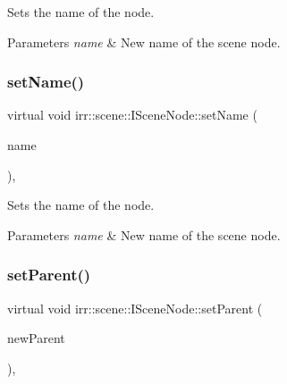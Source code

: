 Sets the name of the node. 


\begin{DoxyParams}{Parameters}
{\em name} & New name of the scene node. \\
\hline
\end{DoxyParams}
\mbox{\label{classirr_1_1scene_1_1ISceneNode_a20a22d956974f4817a20663361f20042}} 
\subsubsection{\texorpdfstring{set\+Name()}{setName()}\hspace{0.1cm}{\footnotesize\ttfamily [4/4]}}
{\footnotesize\ttfamily virtual void irr\+::scene\+::\+I\+Scene\+Node\+::set\+Name (\begin{DoxyParamCaption}\item[{const \hyperlink{namespaceirr_1_1core_ab26a0e0359206b5a694f35c37c829d7f}{core\+::stringc} \&}]{name }\end{DoxyParamCaption})\hspace{0.3cm}{\ttfamily [inline]}, {\ttfamily [virtual]}}



Sets the name of the node. 


\begin{DoxyParams}{Parameters}
{\em name} & New name of the scene node. \\
\hline
\end{DoxyParams}
\mbox{\label{classirr_1_1scene_1_1ISceneNode_a59e7f36cb5c9c4895e06fce0ca5eb276}} 
\subsubsection{\texorpdfstring{set\+Parent()}{setParent()}\hspace{0.1cm}{\footnotesize\ttfamily [1/2]}}
{\footnotesize\ttfamily virtual void irr\+::scene\+::\+I\+Scene\+Node\+::set\+Parent (\begin{DoxyParamCaption}\item[{\hyperlink{classirr_1_1scene_1_1ISceneNode}{I\+Scene\+Node} $\ast$}]{new\+Parent }\end{DoxyParamCaption})\hspace{0.3cm}{\ttfamily [inline]}, {\ttfamily [virtual]}}



